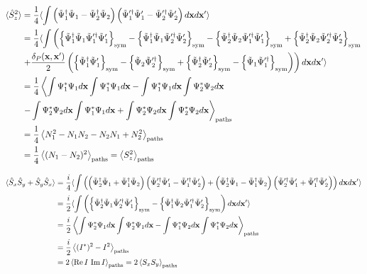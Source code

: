 \begin{equation*}
\begin{split}
	\langle \hat{S}^2_z \rangle
	& = \frac{1}{4} \langle \int \left(
		\tilde{\Psi}^\dagger_1 \tilde{\Psi}_1 - \tilde{\Psi}^\dagger_2 \tilde{\Psi}_2
	\right)
	\left(
		\tilde{\Psi}^{\prime\dagger}_1 \tilde{\Psi}^\prime_1 - \tilde{\Psi}^{\prime\dagger}_2 \tilde{\Psi}^\prime_2
	\right) d\mathbf{x} d\mathbf{x}^\prime \rangle \\
	& = \frac{1}{4} \langle \int \left(
		\left\{  \tilde{\Psi}^\dagger_1 \tilde{\Psi}_1 \tilde{\Psi}^{\prime\dagger}_1 \tilde{\Psi}^\prime_1  \right\}_{\mathrm{sym}}
		- \left\{  \tilde{\Psi}^\dagger_1 \tilde{\Psi}_1 \tilde{\Psi}^{\prime\dagger}_2 \tilde{\Psi}^\prime_2  \right\}_{\mathrm{sym}}
		- \left\{  \tilde{\Psi}^\dagger_2 \tilde{\Psi}_2 \tilde{\Psi}^{\prime\dagger}_1 \tilde{\Psi}^\prime_1  \right\}_{\mathrm{sym}}
		+ \left\{  \tilde{\Psi}^\dagger_2 \tilde{\Psi}_2 \tilde{\Psi}^{\prime\dagger}_2 \tilde{\Psi}^\prime_2  \right\}_{\mathrm{sym}}
	\right. \\
	& \left.
		+ \frac{\delta_P(\mathbf{x},\mathbf{x}^\prime)}{2} \left(
			\left\{  \tilde{\Psi}^\dagger_1 \tilde{\Psi}^\prime_1  \right\}_{\mathrm{sym}}
			- \left\{  \tilde{\Psi}_2 \tilde{\Psi}^{\prime\dagger}_2  \right\}_{\mathrm{sym}}
			+ \left\{  \tilde{\Psi}^\dagger_2 \tilde{\Psi}^\prime_2  \right\}_{\mathrm{sym}}
			- \left\{  \tilde{\Psi}_1 \tilde{\Psi}^{\prime\dagger}_1  \right\}_{\mathrm{sym}}
		\right)
	\right) d\mathbf{x} d\mathbf{x}^\prime \rangle \\
	& = \frac{1}{4} \left\langle
		\int \Psi^*_1 \Psi_1 d\mathbf{x} \int \Psi^*_1 \Psi_1 d\mathbf{x}
		- \int \Psi^*_1 \Psi_1 d\mathbf{x} \int \Psi^*_2 \Psi_2 d\mathbf{x} \right. \\
	&	\left. - \int \Psi^*_2 \Psi_2 d\mathbf{x} \int \Psi^*_1 \Psi_1 d\mathbf{x}
		+ \int \Psi^*_2 \Psi_2 d\mathbf{x} \int \Psi^*_2 \Psi_2 d\mathbf{x} \right\rangle_{\mathrm{paths}} \\
	& = \frac{1}{4} \left\langle  N^2_1 - N_1 N_2 - N_2 N_1 + N^2_2  \right\rangle_{\mathrm{paths}} \\
	& = \frac{1}{4} \left\langle  (N_1 - N_2)^2  \right\rangle_{\mathrm{paths}} = \left\langle  S^2_z  \right\rangle_{\mathrm{paths}}
\end{split}
\end{equation*}

\begin{equation*}
\begin{split}
	\langle \hat{S}_x \hat{S}_y + \hat{S}_y \hat{S}_x \rangle
	& = \frac{i}{4} \langle \int \left(
		\left(
			\tilde{\Psi}^\dagger_2 \tilde{\Psi}_1 + \tilde{\Psi}^\dagger_1 \tilde{\Psi}_2
		\right)
		\left(
			\tilde{\Psi}^{\prime\dagger}_2 \tilde{\Psi}^\prime_1 - \tilde{\Psi}^{\prime\dagger}_1 \tilde{\Psi}^\prime_2
		\right)
		+ \left(
			\tilde{\Psi}^\dagger_2 \tilde{\Psi}_1 - \tilde{\Psi}^\dagger_1 \tilde{\Psi}_2
		\right)
		\left(
			\tilde{\Psi}^{\prime\dagger}_2 \tilde{\Psi}^\prime_1 + \tilde{\Psi}^{\prime\dagger}_1 \tilde{\Psi}^\prime_2
		\right)
	\right) d\mathbf{x} d\mathbf{x}^\prime \rangle \\
	& = \frac{i}{2} \langle \int \left(
		\left\{  \tilde{\Psi}^\dagger_2 \tilde{\Psi}_1 \tilde{\Psi}^{\prime\dagger}_2 \tilde{\Psi}^\prime_1  \right\}_{\mathrm{sym}}
		- \left\{  \tilde{\Psi}^\dagger_1 \tilde{\Psi}_2 \tilde{\Psi}^{\prime\dagger}_1 \tilde{\Psi}^\prime_2  \right\}_{\mathrm{sym}}
	\right) d\mathbf{x} d\mathbf{x}^\prime \rangle \\
	& = \frac{i}{2} \left\langle 
		\int \Psi^*_2 \Psi_1 d\mathbf{x} \int \Psi^*_2 \Psi_1 d\mathbf{x}
		- \int \Psi^*_1 \Psi_2 d\mathbf{x} \int \Psi^*_1 \Psi_2 d\mathbf{x}  \right\rangle_{\mathrm{paths}} \\
	& = \frac{i}{2} \left\langle  (I^*)^2 - I^2  \right\rangle_{\mathrm{paths}} \\
	& = 2 \left\langle  \operatorname{Re} I \, \operatorname{Im} I  \right\rangle_{\mathrm{paths}} = 2 \left\langle  S_x S_y  \right\rangle_{\mathrm{paths}}
\end{split}
\end{equation*}

